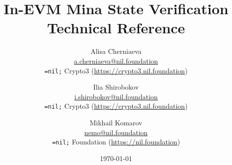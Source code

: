 \setlength{\droptitle}{-4\baselineskip} %

\pretitle{\begin{center}\Huge\bfseries} %
\title{In-EVM Mina State Verification \\[1ex] \large Technical Reference} %
\posttitle{\end{center}} %
\author{ %
	\protect\begin{tabular}{c} \normalsize Alisa Cherniaeva \\
	    \normalsize \href{mailto:a.cherniaeva@nil.foundation}{a.cherniaeva@nil.foundation} \\
	    \normalsize \texttt{=nil;} Crypto3 (\url{https://crypto3.nil.foundation})\\ 
	\protect\end{tabular}
	\and
	\protect\begin{tabular}{c} \normalsize Ilia Shirobokov \\
	    \normalsize \href{mailto:i.shirobokov@nil.foundation}{i.shirobokov@nil.foundation} \\
	    \normalsize \texttt{=nil;} Crypto3 (\url{https://crypto3.nil.foundation})\\ 
	\protect\end{tabular}
    \and
    \protect\begin{tabular}{c} \normalsize Mikhail Komarov \\
	    \normalsize \href{mailto:nemo@nil.foundation}{nemo@nil.foundation} \\
	    \normalsize \texttt{=nil;} Foundation (\url{https://nil.foundation})\\ 
	\protect\end{tabular}
}
\date{\today} %

